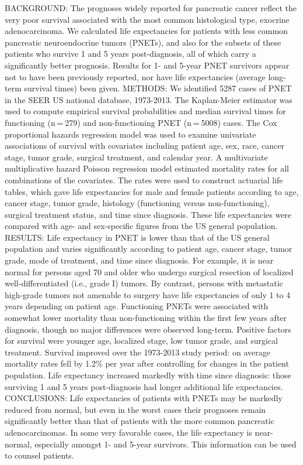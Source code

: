 \documentclass[]{article}
\begin{document}
BACKGROUND: The prognoses widely reported for pancreatic cancer reflect
the very poor survival associated with the most common histological
type, exocrine adenocarcinoma. We calculated life expectancies for
patients with less common pancreatic neuroendocrine tumors (PNETs), and
also for the subsets of these patients who survive 1 and 5 years
post-diagnosis, all of which carry a significantly better prognosis.
Results for 1- and 5-year PNET survivors appear not to have been
previously reported, nor have life expectancies (average long-term
survival times) been given. METHODS: We identified 5287 cases of PNET in
the SEER US national database, 1973-2013. The Kaplan-Meier estimator was
used to compute empirical survival probabilities and median survival
times for functioning (n = 279) and non-functioning PNET (n = 5008)
cases. The Cox proportional hazards regression model was used to examine
univariate associations of survival with covariates including patient
age, sex, race, cancer stage, tumor grade, surgical treatment, and
calendar year. A multivariate multiplicative hazard Poisson regression
model estimated mortality rates for all combinations of the covariates.
The rates were used to construct actuarial life tables, which gave life
expectancies for male and female patients according to age, cancer
stage, tumor grade, histology (functioning versus non-functioning),
surgical treatment status, and time since diagnosis. These life
expectancies were compared with age- and sex-specific figures from the
US general population. RESULTS: Life expectancy in PNET is lower than
that of the US general population and varies significantly according to
patient age, cancer stage, tumor grade, mode of treatment, and time
since diagnosis. For example, it is near normal for persons aged 70 and
older who undergo surgical resection of localized well-differentiated
(i.e., grade I) tumors. By contrast, persons with metastatic high-grade
tumors not amenable to surgery have life expectancies of only 1 to 4
years depending on patient age. Functioning PNETs were associated with
somewhat lower mortality than non-functioning within the first few years
after diagnosis, though no major differences were observed long-term.
Positive factors for survival were younger age, localized stage, low
tumor grade, and surgical treatment. Survival improved over the
1973-2013 study period: on average mortality rates fell by 1.2\% per
year after controlling for changes in the patient population. Life
expectancy increased markedly with time since diagnosis: those surviving
1 and 5 years post-diagnosis had longer additional life expectancies.
CONCLUSIONS: Life expectancies of patients with PNETs may be markedly
reduced from normal, but even in the worst cases their prognoses remain
significantly better than that of patients with the more common
pancreatic adenocarcinomas. In some very favorable cases, the life
expectancy is near-normal, especially amongst 1- and 5-year survivors.
This information can be used to counsel patients.
\end{document}

